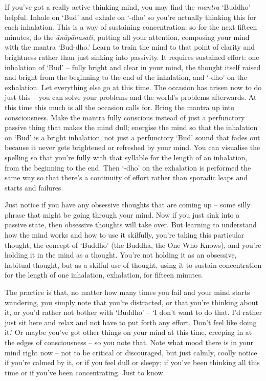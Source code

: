 
If you've got a really active thinking mind, you may find the \textit{mantra} `Buddho' helpful. Inhale on `Bud' and exhale on `-dho' so you're actually thinking this for each inhalation. This is a way of sustaining concentration: so for the next fifteen minutes, do the \textit{ānāpānasati}, putting all your attention, composing your mind with the mantra `Bud-dho.' Learn to train the mind to that point of clarity and brightness rather than just sinking into passivity. It requires sustained effort: one inhalation of `Bud' -- fully bright and clear in your mind, the thought itself raised and bright from the beginning to the end of the inhalation, and `-dho' on the exhalation. Let everything else go at this time. The occasion has arisen now to do just this -- you can solve your problems and the world's problems afterwards. At this time this much is all the occasion calls for. Bring the mantra up into consciousness. Make the mantra fully conscious instead of just a perfunctory passive thing that makes the mind dull; energise the mind so that the inhalation on `Bud' is a bright inhalation, not just a perfunctory `Bud' sound that fades out because it never gets brightened or refreshed by your mind. You can visualise the spelling so that you're fully with that syllable for the length of an inhalation, from the beginning to the end. Then `-dho' on the exhalation is performed the same way so that there's a continuity of effort rather than sporadic leaps and starts and failures.

Just notice if you have any obsessive thoughts that are coming up -- some silly phrase that might be going through your mind. Now if you just sink into a passive state, then obsessive thoughts will take over. But learning to understand how the mind works and how to use it skilfully, you're taking this particular thought, the concept of `Buddho' (the Buddha, the One Who Knows), and you're holding it in the mind as a thought. You're not holding it as an obsessive, habitual thought, but as a skilful use of thought, using it to sustain concentration for the length of one inhalation, exhalation, for fifteen minutes.

The practice is that, no matter how many times you fail and your mind starts wandering, you simply note that you're distracted, or that you're thinking about it, or you'd rather not bother with `Buddho' -- `I don't want to do that. I'd rather just sit here and relax and not have to put forth any effort. Don't feel like doing it.' Or maybe you've got other things on your mind at this time, creeping in at the edges of consciousness -- so you note that. Note what mood there is in your mind right now -- not to be critical or discouraged, but just calmly, coolly notice if you're calmed by it, or if you feel dull or sleepy; if you've been thinking all this time or if you've been concentrating. Just to know.

